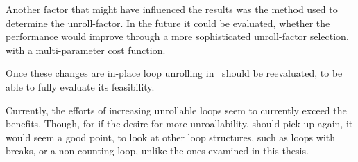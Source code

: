 Another factor that might have influenced the results was the method used to determine the unroll-factor.
In the future it could be evaluated, whether the performance would improve through a more sophisticated unroll-factor selection, with a multi-parameter cost function.

Once these changes are in-place loop unrolling in~\libFIRM{} should be reevaluated, to be able to fully evaluate its feasibility.

Currently, the efforts of increasing unrollable loops seem to currently exceed the benefits.
Though, for if the desire for more unroallability, should pick up again, it would seem a good point, to look at other loop structures, such as loops with breaks, or a non-counting loop, unlike the ones examined in this thesis.
